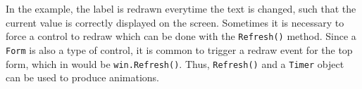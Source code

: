 \documentclass[fsharpNotes.tex]{subfiles}
\begin{document}
In the example, the label is redrawn everytime the text is changed, such that the current value is correctly displayed on the screen. Sometimes it is necessary to force a control to redraw which can be done with the \lstinline{Refresh()} method. Since a \lstinline{Form} is also a type of control, it is common to trigger a redraw event for the top form, which in  would be \lstinline{win.Refresh()}. Thus, \lstinline{Refresh()} and a \lstinline{Timer} object can be used to produce animations.

\clearpage
\end{document}
